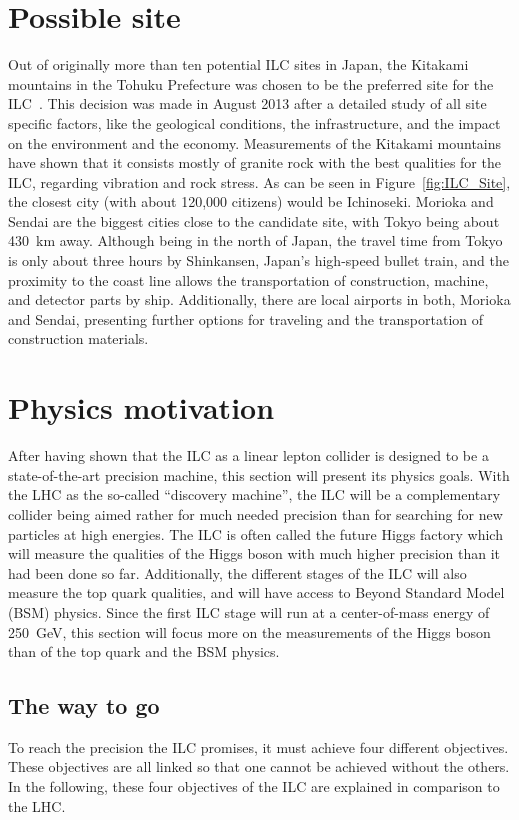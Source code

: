 \section{Possible site}
Out of originally more than ten potential ILC sites in Japan, the Kitakami mountains in the Tohuku Prefecture was chosen to be the preferred site for the ILC~\cite{Site}.
This decision was made in August 2013 after a detailed study of all site specific factors, like the geological conditions, the infrastructure, and the impact on the environment and the economy.
Measurements of the Kitakami mountains have shown that it consists mostly of granite rock with the best qualities for the ILC, regarding vibration and rock stress.
As can be seen in Figure~\ref{fig:ILC_Site}, the closest city (with about 120,000 citizens) would be Ichinoseki.
Morioka and Sendai are the biggest cities close to the candidate site, with Tokyo being about \SI{430}{\kilo\meter} away.
Although being in the north of Japan, the travel time from Tokyo is only about three hours by Shinkansen, Japan's high-speed bullet train, and the proximity to the coast line allows the transportation of construction, machine, and detector parts by ship.
Additionally, there are local airports in both, Morioka and Sendai, presenting further options for traveling and the transportation of construction materials.


\section{Physics motivation}
\label{ILC:physicsmotivation}
After having shown that the ILC as a linear lepton collider is designed to be a state-of-the-art precision machine, this section will present its physics goals.
With the LHC as the so-called ``discovery machine'', the ILC will be a complementary collider being aimed rather for much needed precision than for searching for new particles at high energies.
The ILC is often called the future Higgs factory which will measure the qualities of the Higgs boson with much higher precision than it had been done so far.
Additionally, the different stages of the ILC will also measure the top quark qualities, and will have access to Beyond Standard Model (BSM) physics.
Since the first ILC stage will run at a center-of-mass energy of \SI{250}{\GeV}, this section will focus more on the measurements of the Higgs boson than of the top quark and the BSM physics.
 
\subsection{The way to go}
To reach the precision the ILC promises, it must achieve four different objectives.
These objectives are all linked so that one cannot be achieved without the others.
In the following, these four objectives of the ILC are explained in comparison to the LHC.

